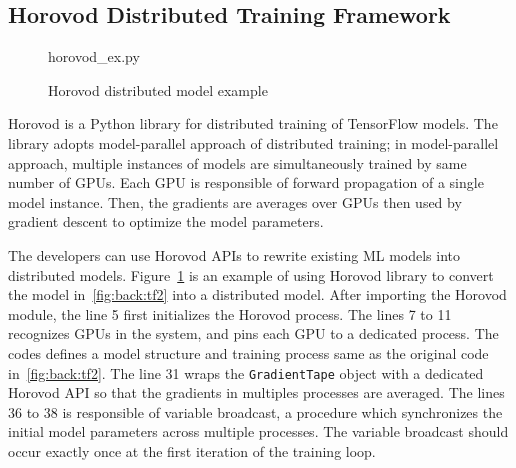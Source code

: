 \subsection{Horovod Distributed Training Framework}

\begin{figure}
 
{horovod_ex.py}
  \caption{Horovod distributed model example}
\label{fig:back:hvd} 
\end{figure}

Horovod is a Python library for distributed training of TensorFlow models.
The library adopts model-parallel approach of distributed training;
in model-parallel approach, multiple instances of models are simultaneously
trained by same number of GPUs.
Each GPU is responsible of forward propagation of a single model instance.
Then, the gradients are averages over GPUs then used by gradient descent
to optimize the model parameters. 

The developers can use Horovod APIs to rewrite existing ML models into
distributed models.
Figure~\ref{fig:back:hvd} is an example of using Horovod library to convert
the model in~\ref{fig:back:tf2} into a distributed model.
After importing the Horovod module, the line 5 first initializes the
Horovod process. 
The lines 7 to 11 recognizes GPUs in the system, and pins each GPU to
a dedicated process.
The codes defines a model structure and training process same as the original
code in~\ref{fig:back:tf2}.
The line 31 wraps the {\tt GradientTape} object with a dedicated 
Horovod API so that the gradients in multiples processes are averaged.
The lines 36 to 38 is responsible of variable broadcast, a procedure which
synchronizes the initial model parameters across multiple processes.
The variable broadcast should occur exactly once at the first iteration of
the training loop.
